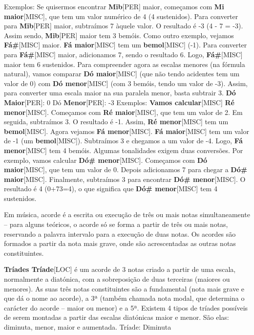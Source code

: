 \documentclass[a4paper,12pt]{article}
\begin{document}
Exemplos: Se quisermos encontrar \textbf{Mib}\textsc{[PER]} maior, começamos com \textbf{Mi maior}\textsc{[MISC]}, que tem um valor numérico de 4 (4 sustenidos). Para converter para \textbf{Mib}\textsc{[PER]} maior, subtraímos 7 àquele valor. O resultado é -3 (4 - 7 = -3). Assim sendo, \textbf{Mib}\textsc{[PER]} maior tem 3 bemóis. Como outro exemplo, vejamos \textbf{Fá\#}\textsc{[MISC]} maior. \textbf{Fá maior}\textsc{[MISC]} tem um \textbf{bemol}\textsc{[MISC]} (-1). Para converter para \textbf{Fá\#}\textsc{[MISC]} maior, adicionamos 7, sendo o resultado 6. Logo, \textbf{Fá\#}\textsc{[MISC]} maior tem 6 sustenidos. Para compreender agora as escalas menores (na fórmula natural), vamos comparar \textbf{Dó maior}\textsc{[MISC]} (que não tendo acidentes tem um valor de 0) com \textbf{Dó menor}\textsc{[MISC]} (com 3 bemóis, tendo um valor de -3). Assim, para converter uma escala maior na sua paralela menor, basta subtrair 3. \textbf{Dó Maior}\textsc{[PER]}: 0 Dó \textbf{Menor}\textsc{[PER]}: -3 Exemplos: \textbf{Vamos calcular}\textsc{[MISC]} \textbf{Ré menor}\textsc{[MISC]}. Começamos com \textbf{Ré maior}\textsc{[MISC]}, que tem um valor de 2. Em seguida, subtraímos 3. O resultado é -1. Assim, \textbf{Ré menor}\textsc{[MISC]} tem um \textbf{bemol}\textsc{[MISC]}. Agora vejamos \textbf{Fá menor}\textsc{[MISC]}. \textbf{Fá maior}\textsc{[MISC]} tem um valor de -1 (um \textbf{bemol}\textsc{[MISC]}). Subtraímos 3 e chegamos a um valor de -4. Logo, \textbf{Fá menor}\textsc{[MISC]} tem 4 bemóis. Algumas tonalidades exigem duas conversões. Por exemplo, vamos calcular \textbf{Dó\# menor}\textsc{[MISC]}. Começamos com \textbf{Dó maior}\textsc{[MISC]}, que tem um valor de 0. Depois adicionamos 7 para chegar a \textbf{Dó\# maior}\textsc{[MISC]}. Finalmente, subtraímos 3 para encontrar \textbf{Dó\# menor}\textsc{[MISC]}. O resultado é 4 (0+73=4), o que significa que \textbf{Dó\# menor}\textsc{[MISC]} tem 4 sustenidos.

Em música, acorde é a escrita ou execução de três ou mais notas simultaneamente -- para alguns teóricos, o acorde só se forma a partir de três ou mais notas, reservando a palavra intervalo para a execução de duas notas. Os acordes são formados a partir da nota mais grave, onde são acrescentadas as outras notas constituintes.

\textbf{Tríades Tríade}\textsc{[LOC]} é um acorde de 3 notas criado a partir de uma escala, normalmente a diatónica, com a sobreposição de duas terceiras (maiores ou menores). As suas três notas constituintes são a fundamental (nota mais grave e que dá o nome ao acorde), a 3ª (também chamada nota modal, que determina o carácter do acorde -- maior ou menor) e a 5ª. Existem 4 tipos de tríades possíveis de serem montadas a partir das escalas diatónicas maior e menor. São elas: diminuta, menor, maior e aumentada. Tríade: Diminuta
\end{document}
